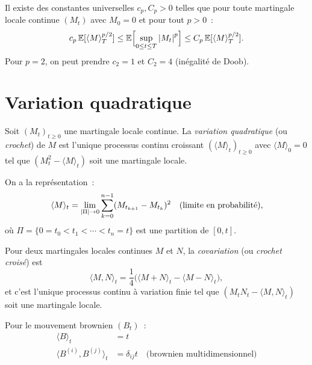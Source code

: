 \begin{theoreme}
\label{thm:BDG}
Il existe des constantes universelles $c_p, C_p > 0$ telles que pour toute
martingale locale continue $(M_t)$ avec $M_0 = 0$ et pour tout $p > 0$~:
\[
  c_p \, \mathbb{E}[\langle M \rangle_T^{p/2}]
  \leq \mathbb{E}\Bigl[\sup_{0 \leq t \leq T} \left| M_t \right|^p\Bigr]
  \leq C_p \, \mathbb{E}[\langle M \rangle_T^{p/2}].
\]
Pour $p = 2$, on peut prendre $c_2 = 1$ et $C_2 = 4$ (in\'egalit\'e de Doob).
\end{theoreme}

\section{Variation quadratique}

\begin{definition}
\label{def:variation_quadratique}
Soit $(M_t)_{t \geq 0}$ une martingale locale continue. La \emph{variation
quadratique} (ou \emph{crochet}) de $M$ est l'unique processus continu croissant
$(\langle M \rangle_t)_{t \geq 0}$ avec $\langle M \rangle_0 = 0$ tel que
$(M_t^2 - \langle M \rangle_t)$ soit une martingale locale.

On a la repr\'esentation~:
\[
  \langle M \rangle_t = \lim_{\left| \Pi \right| \to 0}
  \sum_{k=0}^{n-1} (M_{t_{k+1}} - M_{t_k})^2 \quad \text{(limite en probabilit\'e)},
\]
o\`u $\Pi = \{0 = t_0 < t_1 < \cdots < t_n = t\}$ est une partition de $[0, t]$.
\end{definition}

\begin{definition}[Covariation]
Pour deux martingales locales continues $M$ et $N$, la \emph{covariation}
(ou \emph{crochet crois\'e}) est
\[
  \langle M, N \rangle_t = \frac{1}{4}\bigl(\langle M + N \rangle_t
  - \langle M - N \rangle_t\bigr),
\]
et c'est l'unique processus continu \`a variation finie tel que
$(M_t N_t - \langle M, N \rangle_t)$ soit une martingale locale.
\end{definition}

\begin{formules}[title=\textbf{Variations quadratiques fondamentales}]
Pour le mouvement brownien $(B_t)$~:
\begin{align*}
  \langle B \rangle_t &= t \\
  \langle B^{(i)}, B^{(j)} \rangle_t &= \delta_{ij} t
    \quad \text{(brownien multidimensionnel)}
\end{align*}
\end{formules}

